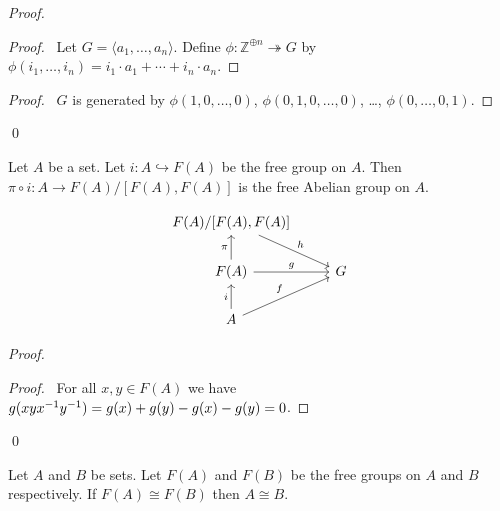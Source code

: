 \begin{proof}
\pf
{}
\begin{proof}
	\pf\ Let $G = \langle a_1, \ldots, a_n \rangle$. Define $\phi : \mathbb{Z}^{\oplus n} \twoheadrightarrow G$ by $\phi(i_1, \ldots, i_n) = i_1 \cdot a_1 + \cdots + i_n \cdot a_n$.
\end{proof}
\begin{proof}
	\pf\ $G$ is generated by $\phi(1, 0, \ldots, 0)$, $\phi(0, 1, 0, \ldots, 0)$, \ldots, $\phi(0, \ldots, 0, 1)$.
\end{proof}
\qed
\end{proof}

\begin{prop}
Let $A$ be a set. Let $i : A \hookrightarrow F(A)$ be the free group on $A$. Then $\pi \circ i : A \rightarrow F(A) / [F(A),F(A)]$ is the free Abelian group on $A$.
\end{prop}

\[ \begin{tikzcd}
F(A)/[F(A),F(A)] \arrow[dr,"h"] \\
F(A) \arrow[r,"g"] \arrow[u,"\pi"] & G \\
A \arrow[u,"i"] \arrow[ur,"f"]
\end{tikzcd} \]

\begin{proof}
\pf
{}
\begin{proof}
	\pf\ For all $x,y \in F(A)$ we have $g(xy{x}^{-1}{y}^{-1}) = g(x) + g(y) - g(x) - g(y) = 0$.
\end{proof}
\qed
\end{proof}

\begin{cor}
Let $A$ and $B$ be sets. Let $F(A)$ and $F(B)$ be the free groups on $A$ and $B$ respectively. If $F(A) \cong F(B)$ then $A \cong B$.
\end{cor}

